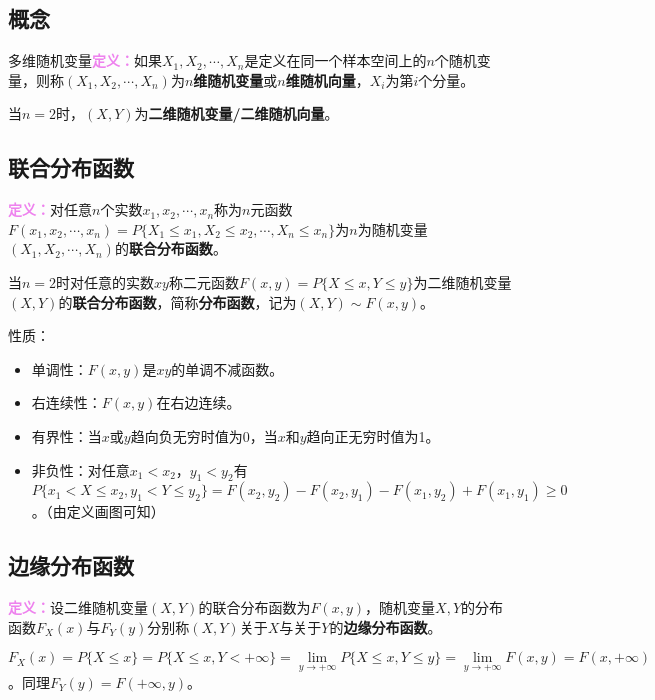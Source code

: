 \subsection{概念}

多维随机变量\textcolor{violet}{\textbf{定义：}}如果$X_1,X_2,\cdots,X_n$是定义在同一个样本空间上的$n$个随机变量，则称$(X_1,X_2,\cdots,X_n)$为\textbf{$n$维随机变量}或\textbf{$n$维随机向量}，$X_i$为第$i$个分量。

当$n=2$时，$(X,Y)$为\textbf{二维随机变量/二维随机向量}。

\subsection{联合分布函数}

\textcolor{violet}{\textbf{定义：}}对任意$n$个实数$x_1,x_2,\cdots,x_n$称为$n$元函数$F(x_1,x_2,\cdots,x_n)=P\{X_1\leqslant x_1,X_2\leqslant x_2,\cdots,X_n\leqslant x_n\}$为$n$为随机变量$(X_1,X_2,\cdots,X_n)$的\textbf{联合分布函数}。

当$n=2$时对任意的实数$xy$称二元函数$F(x,y)=P\{X\leqslant x,Y\leqslant y\}$为二维随机变量$(X,Y)$的\textbf{联合分布函数}，简称\textbf{分布函数}，记为$(X,Y)\sim F(x,y)$。

性质：

\begin{itemize}
    \item 单调性：$F(x,y)$是$xy$的单调不减函数。
    \item 右连续性：$F(x,y)$在右边连续。
    \item 有界性：当$x$或$y$趋向负无穷时值为0，当$x$和$y$趋向正无穷时值为1。
    \item 非负性：对任意$x_1<x_2$，$y_1<y_2$有$P\{x_1<X\leqslant x_2,y_1<Y\leqslant y_2\}=F(x_2,y_2)-F(x_2,y_1)-F(x_1,y_2)+F(x_1,y_1)\geqslant0$。（由定义画图可知）
\end{itemize}

\subsection{边缘分布函数}

\textcolor{violet}{\textbf{定义：}}设二维随机变量$(X,Y)$的联合分布函数为$F(x,y)$，随机变量$X,Y$的分布函数$F_X(x)$与$F_Y(y)$分别称$(X,Y)$关于$X$与关于$Y$的\textbf{边缘分布函数}。

$F_X(x)=P\{X\leqslant x\}=P\{X\leqslant x,Y<+\infty\}=\lim\limits_{y\to+\infty}P\{X\leqslant x,Y\leqslant y\}=\lim\limits_{y\to+\infty}F(x,y)=F(x,+\infty)$。同理$F_Y(y)=F(+\infty,y)$。

